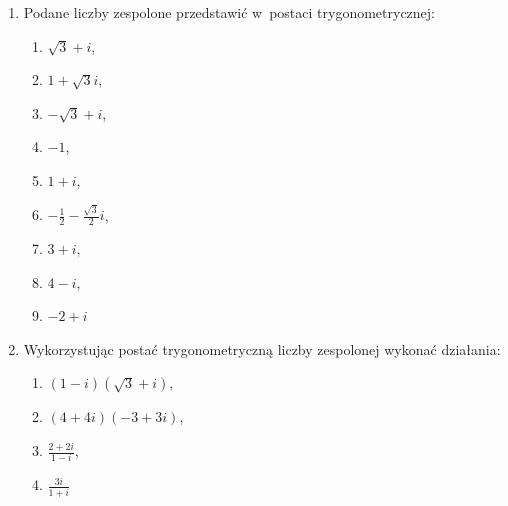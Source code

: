\documentclass{article}
\begin{document}
\begin{enumerate}
    \item Podane liczby zespolone przedstawić w~postaci trygonometrycznej:
    \begin{enumerate}
        \item $\sqrt{3} + i$,
        \item $1 + \sqrt{3}i$,
        \item $-\sqrt{3} + i$,
        \item $-1$,
        \item $1 + i$,
        \item $-\frac{1}{2} - \frac{\sqrt{3}}{2}i$,
        \item $3 + i$,
        \item $4 - i$,
        \item $-2 + i$
    \end{enumerate}

    \item Wykorzystując postać trygonometryczną liczby zespolonej wykonać działania:
    \begin{enumerate}
        \item $(1-i)(\sqrt{3}+i)$,
        \item $(4 + 4i)(-3+3i)$,
        \item $\frac{2+2i}{1-i}$,
        \item $\frac{3i}{1+i}$
    \end{enumerate}

\end{enumerate}
\end{document}
